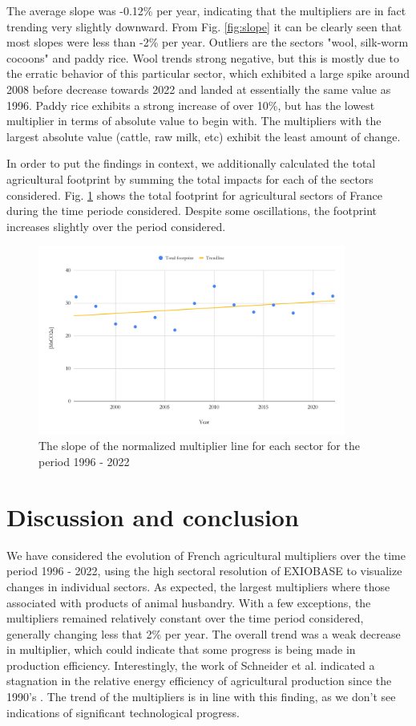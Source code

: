\documentclass[a4paper,twoside]{article}
\begin{document}
The average slope was -0.12\% per year, indicating that the multipliers are in fact trending very slightly downward. From Fig. \ref{fig:slope} it can be clearly seen that most slopes were less than -2\% per year. Outliers are the sectors "wool, silk-worm cocoons" and paddy rice. Wool trends strong negative, but this is mostly due to the erratic behavior of this particular sector, which exhibited a large spike around 2008 before decrease towards 2022 and landed at essentially the same value as 1996. Paddy rice exhibits a strong increase of over 10\%, but has the lowest multiplier in terms of absolute value to begin with. The multipliers with the largest absolute value (cattle, raw milk, etc) exhibit the least amount of change.

In order to put the findings in context, we additionally calculated the total agricultural footprint by summing the total impacts for each of the sectors considered. Fig. \ref{fig:totalfootprint} shows the total footprint for agricultural sectors of France during the time periode considered. Despite some oscillations, the footprint increases slightly over the period considered.

\begin{figure}[H]
\centering
\includegraphics[width=0.9\textwidth]{totalfootprint}
\caption{The slope of the normalized multiplier line for each sector for the period 1996 - 2022}\label{fig:totalfootprint} 
\end{figure}

\section{Discussion and conclusion}

We have considered the evolution of French agricultural multipliers over the time period 1996 - 2022, using the high sectoral resolution of EXIOBASE to visualize changes in individual sectors. As expected, the largest multipliers where those associated with products of animal husbandry. With a few exceptions, the multipliers remained relatively constant over the time period considered, generally changing less that 2\% per year. The overall trend was a weak decrease in multiplier, which could indicate that some progress is being made in production efficiency. Interestingly, the work of Schneider et al. indicated a stagnation in the relative energy efficiency of agricultural production since the 1990's \cite{Schneider2009}. The trend of the multipliers is in line with this finding, as we don't see indications of significant technological progress.
\end{document}
